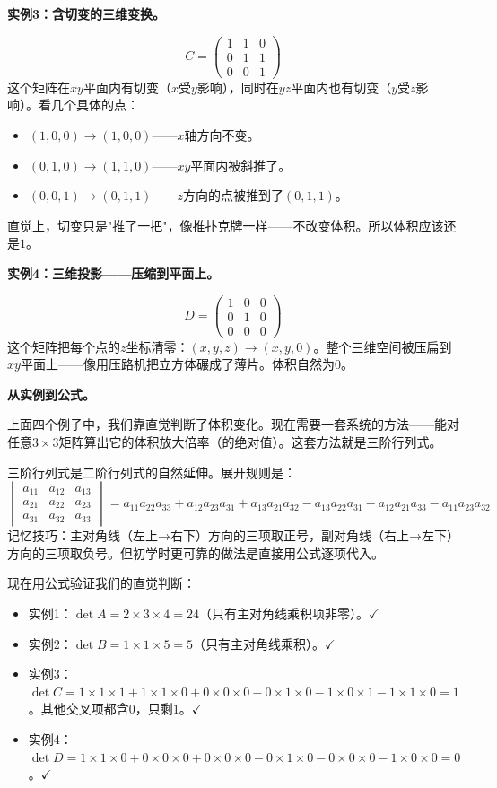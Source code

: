 \vspace{0.2cm}
\noindent\textbf{实例3：含切变的三维变换。}

\[
C = \begin{pmatrix}1&1&0\\0&1&1\\0&0&1\end{pmatrix}
\]
这个矩阵在$xy$平面内有切变（$x$受$y$影响），同时在$yz$平面内也有切变（$y$受$z$影响）。看几个具体的点：
\begin{itemize}
\item $(1,0,0)\to(1,0,0)$——$x$轴方向不变。
\item $(0,1,0)\to(1,1,0)$——$xy$平面内被斜推了。
\item $(0,0,1)\to(0,1,1)$——$z$方向的点被推到了$(0,1,1)$。
\end{itemize}
直觉上，切变只是"推了一把"，像推扑克牌一样——不改变体积。所以体积应该还是$1$。

\vspace{0.2cm}
\noindent\textbf{实例4：三维投影——压缩到平面上。}

\[
D = \begin{pmatrix}1&0&0\\0&1&0\\0&0&0\end{pmatrix}
\]
这个矩阵把每个点的$z$坐标清零：$(x,y,z)\to(x,y,0)$。整个三维空间被压扁到$xy$平面上——像用压路机把立方体碾成了薄片。体积自然为$0$。

\vspace{0.2cm}
\noindent\textbf{从实例到公式。}

上面四个例子中，我们靠直觉判断了体积变化。现在需要一套系统的方法——能对任意$3\times3$矩阵算出它的体积放大倍率（的绝对值）。这套方法就是三阶行列式。

三阶行列式是二阶行列式的自然延伸。展开规则是：
\[
\begin{vmatrix}
a_{11}&a_{12}&a_{13}\\
a_{21}&a_{22}&a_{23}\\
a_{31}&a_{32}&a_{33}
\end{vmatrix}
= a_{11}a_{22}a_{33}+a_{12}a_{23}a_{31}+a_{13}a_{21}a_{32}
-a_{13}a_{22}a_{31}-a_{12}a_{21}a_{33}-a_{11}a_{23}a_{32}
\]
记忆技巧：主对角线（左上→右下）方向的三项取正号，副对角线（右上→左下）方向的三项取负号。但初学时更可靠的做法是直接用公式逐项代入。

现在用公式验证我们的直觉判断：
\begin{itemize}
\item 实例1：$\det A=2\times3\times4=24$（只有主对角线乘积项非零）。$\checkmark$
\item 实例2：$\det B=1\times1\times5=5$（只有主对角线乘积）。$\checkmark$
\item 实例3：$\det C=1\times1\times1+1\times1\times0+0\times0\times0-0\times1\times0-1\times0\times1-1\times1\times0=1$。其他交叉项都含$0$，只剩$1$。$\checkmark$
\item 实例4：$\det D=1\times1\times0+0\times0\times0+0\times0\times0-0\times1\times0-0\times0\times0-1\times0\times0=0$。$\checkmark$
\end{itemize}

